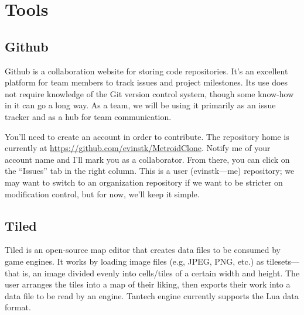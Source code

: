 \documentclass{article}
\begin{document}
\begin{comment}
\subsection*{Sound Design}

\subsection*{Level Design}

\subsection*{Scripting}

\subsection*{Programming}

\subsection*{Testing}
\end{comment}

\section{Tools}

\subsection*{Github}
Github is a collaboration website for storing code repositories. It's an excellent platform for team members to track issues and project milestones. Its use does not require knowledge of the Git version control system, though some know-how in it can go a long way. As a team, we will be using it primarily as an issue tracker and as a hub for team communication.

You'll need to create an account in order to contribute. The repository home is currently at \url{https://github.com/evinstk/MetroidClone}. Notify me of your account name and I'll mark you as a collaborator. From there, you can click on the ``Issues'' tab in the right column. This is a user (evinstk---me) repository; we may want to switch to an organization repository if we want to be stricter on modification control, but for now, we'll keep it simple.

\subsection*{Tiled}
Tiled is an open-source map editor that creates data files to be consumed by game engines. It works by loading image files (e.g, JPEG, PNG, etc.) as tilesets---that is, an image divided evenly into cells/tiles of a certain width and height. The user arranges the tiles into a map of their liking, then exports their work into a data file to be read by an engine. Tantech engine currently supports the Lua data format.
\end{document}
